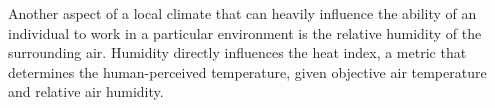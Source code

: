 Another aspect of a local climate that can heavily influence the ability of an individual to work in a particular environment is the relative humidity of the surrounding air. Humidity directly influences the heat index, a metric that determines the human-perceived temperature, given objective air temperature and relative air humidity. 
